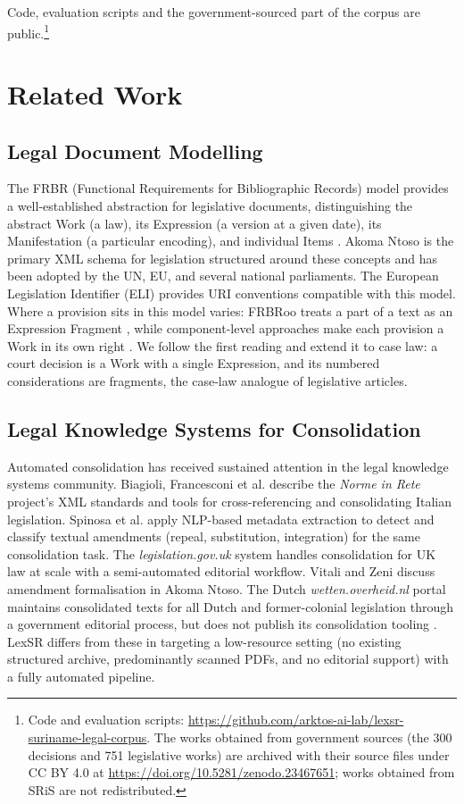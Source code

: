 \documentclass{IOS-Book-Article}
\newcommand{\corpusurl}{\url{https://doi.org/10.5281/zenodo.23467651}}
\begin{document}
Code, evaluation scripts and the government-sourced part of the corpus are
public.\footnote{Code and evaluation scripts:
\url{https://github.com/arktos-ai-lab/lexsr-suriname-legal-corpus}. The works obtained from
government sources (the 300 decisions and 751 legislative works) are archived with their
source files under CC BY 4.0 at \corpusurl; works obtained from SRiS are not redistributed.}

\section{Related Work}
\label{sec:related}

\subsection{Legal Document Modelling}

The FRBR (Functional Requirements for Bibliographic Records) model provides a
well-established abstraction for legislative documents, distinguishing the abstract Work
(a law), its Expression (a version at a given date), its Manifestation (a particular
encoding), and individual Items \cite{ifla1998}. Akoma Ntoso \cite{palmirani2011a} is
the primary XML schema for legislation structured around these concepts and has been adopted
by the UN, EU, and several national parliaments. The European Legislation Identifier (ELI)
\cite{pubsoffice2012} provides URI conventions compatible with this model. Where a provision
sits in this model varies: FRBRoo treats a part of a text as an Expression Fragment
\cite{frbroo}, while component-level approaches make each provision a Work in its own right
\cite{demartim2025}. We follow the first reading and extend it to case law: a court decision
is a Work with a single Expression, and its numbered considerations are fragments, the
case-law analogue of legislative articles.

\subsection{Legal Knowledge Systems for Consolidation}

Automated consolidation has received sustained attention in the legal knowledge systems
community. Biagioli, Francesconi et al. \cite{francesconi2004} describe the \emph{Norme in
Rete} project's XML standards and tools for cross-referencing and consolidating Italian
legislation. Spinosa et al. \cite{spinosa2009} apply NLP-based metadata extraction to detect
and classify textual amendments (repeal, substitution, integration) for the same
consolidation task. The \emph{legislation.gov.uk} system \cite{sheridan2010}
handles consolidation for UK law at scale with a semi-automated editorial workflow. Vitali
and Zeni \cite{vitali2007} discuss amendment formalisation in Akoma Ntoso. The Dutch
\emph{wetten.overheid.nl} portal maintains consolidated texts for all Dutch and former-colonial
legislation through a government editorial process, but does not publish its consolidation
tooling \cite{koop2022}. LexSR differs from these in targeting a low-resource setting (no
existing structured archive, predominantly scanned PDFs, and no editorial support) with a
fully automated pipeline.
\end{document}
